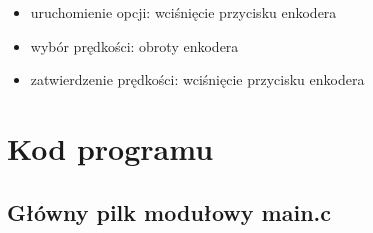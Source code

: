 \documentclass{article}
\begin{document}
\begin{itemize}
	\begin{itemize}
	\item uruchomienie opcji: wciśnięcie przycisku enkodera
	\item wybór prędkości: obroty enkodera
	\item zatwierdzenie prędkości: wciśnięcie przycisku enkodera
	\end{itemize}

\end{itemize}

\section{Kod programu}

\subsection{Główny pilk modułowy main.c}
\end{document}
